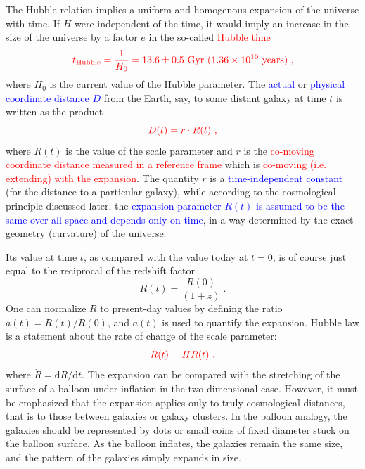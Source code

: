 \documentclass[12pt,a4paper]{article}
\newcommand{\dif}{\mathrm{d}}
\begin{document}
\cite{perkins2008particle} The Hubble relation implies a uniform and homogenous expansion of the universe with time. If $H$ were independent of the time, it would imply an increase in the size of the universe by a factor $e$ in the so-called \textcolor{red}{Hubble time}
\begin{equation}
\color{red} t_{\rm Hubble} = \dfrac{1}{H_0} = 13.6 \pm 0.5 ~{\rm Gyr} ~(1.36 \times 10^{10} ~{\rm years}) ~,
\end{equation}
where $H_0$ is the current value of the Hubble parameter. The \textcolor{blue}{actual} or \textcolor{blue}{physical coordinate distance $D$} from the Earth, say, to some distant galaxy at time $t$ is written as the product
\begin{equation}
\color{red} D(t) = r \cdot R(t) ~,
\end{equation}
where $R(t)$ is the value of the scale parameter and $r$ is the \textcolor{red}{co-moving coordinate distance measured in a reference frame} which is \textcolor{red}{co-moving (i.e. extending) with the expansion}. The quantity $r$ is a \textcolor{blue}{time-independent constant} (for the distance to a particular galaxy), while according to the cosmological principle discussed later, the \textcolor{blue}{expansion parameter $R(t)$ is assumed to be the same over all space and depends only on time}, in a way determined by the exact geometry (curvature) of the universe. 

Its value at time $t$, as compared with the value today at $t = 0$, is of course just equal to the reciprocal of the redshift factor
\begin{equation}
R(t) = \dfrac{R(0)}{(1+z) } ~.
\end{equation}
One can normalize $R$ to present-day values by defining the ratio $a(t) = R(t)/R(0)$, and $a(t)$ is used to quantify the expansion. Hubble law is a statement about the rate of change
of the scale parameter:
\begin{equation}
\color{red} \dot{R}(t) = H R(t) ~,
\end{equation}
where $\dot{R} = \dif R/\dif t$. The expansion can be compared with the stretching of the surface of a balloon under inflation in the two-dimensional case. However, it must be emphasized that the expansion applies only to truly cosmological distances, that is to those between galaxies or galaxy clusters. In the balloon analogy, the galaxies should be represented by dots or small coins of fixed diameter stuck on the balloon surface. As the balloon inflates, the galaxies remain the same size, and the pattern of the galaxies simply expands in size.
\end{document}
